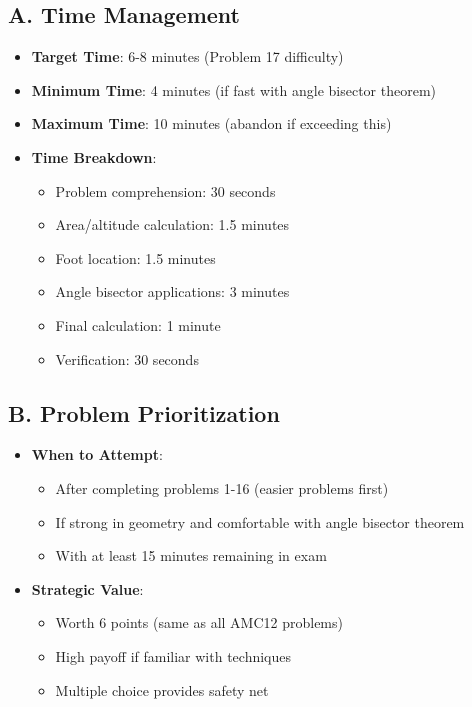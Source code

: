 \documentclass[12pt]{article}
\begin{document}
\begin{competitionbox}
\subsection*{A. Time Management}
\begin{itemize}[leftmargin=*]
    \item \textbf{Target Time}: 6-8 minutes (Problem 17 difficulty)
    \item \textbf{Minimum Time}: 4 minutes (if fast with angle bisector theorem)
    \item \textbf{Maximum Time}: 10 minutes (abandon if exceeding this)
    \item \textbf{Time Breakdown}:
    \begin{itemize}
        \item Problem comprehension: 30 seconds
        \item Area/altitude calculation: 1.5 minutes
        \item Foot location: 1.5 minutes
        \item Angle bisector applications: 3 minutes
        \item Final calculation: 1 minute
        \item Verification: 30 seconds
    \end{itemize}
\end{itemize}

\subsection*{B. Problem Prioritization}
\begin{itemize}[leftmargin=*]
    \item \textbf{When to Attempt}: 
    \begin{itemize}
        \item After completing problems 1-16 (easier problems first)
        \item If strong in geometry and comfortable with angle bisector theorem
        \item With at least 15 minutes remaining in exam
    \end{itemize}
    \item \textbf{Strategic Value}: 
    \begin{itemize}
        \item Worth 6 points (same as all AMC12 problems)
        \item High payoff if familiar with techniques
        \item Multiple choice provides safety net
    \end{itemize}
\end{itemize}


\end{competitionbox}
\end{document}
